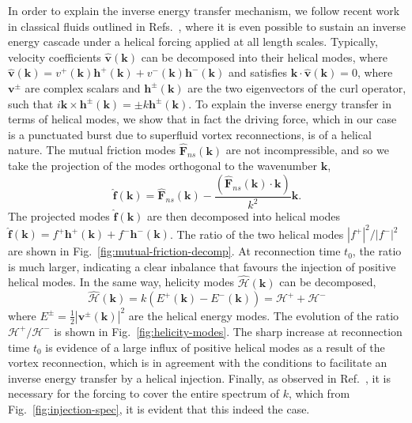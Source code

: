 \documentclass[%
 reprint,
 amsmath,amssymb,
 aps,
 prl,
]{revtex4-2}
\def \v{\mathbf{v}}
\def \k{\mathbf{k}}
\def \h{\mathbf{h}}
\begin{document}
In order to explain the inverse energy transfer mechanism, we follow recent work in classical fluids outlined in Refs.~\cite{biferaleInverseEnergyCascade2012a,plunianInverseCascadeEnergy2020a}, where it is even possible to sustain an inverse energy cascade under a helical forcing applied at all length scales. Typically, velocity coefficients $\hat{\v}(\k)$ can be decomposed into their helical modes, where $\hat{\v}(\k)=v^+(\k)\h^+(\k) + v^-(\k)\h^-(\k)$ and satisfies $\k\cdot\hat{\v}(\k)=0$, where $\v^{\pm}$ are complex scalars and $\h^{\pm}(\k)$ are the two eigenvectors of the curl operator, such that $i\k\times\h^{\pm}(\k)=\pm k \h^{\pm}(\k)$. To explain the inverse energy transfer in terms of helical modes, we show that in fact the driving force, which in our case is a punctuated burst due to superfluid vortex reconnections, is of a helical nature. The mutual friction modes $\hat{\mathbf{F}}_{ns}(\k)$ are not incompressible, and so we take the projection of the modes orthogonal to the wavenumber $\k$,
\begin{equation}
    \hat{\mathbf{f}}(\k) = \hat{\mathbf{F}}_{ns}(\k) - \frac{(\hat{\mathbf{F}}_{ns}(\k)\cdot\k)}{k^2}\k.
\end{equation}
The projected modes $\hat{\mathbf{f}}(\k)$ are then decomposed into helical modes $\hat{\mathbf{f}}(\k)=f^+\h^{+}(\k) + f^-\h^{-}(\k)$. The ratio of the two helical modes $|f^+|^2/|f^-|^2$ are shown in Fig.~\ref{fig:mutual-friction-decomp}. At reconnection time $t_0$, the ratio is much larger, indicating a clear inbalance that favours the injection of positive helical modes. In the same way, helicity modes $\hat{\mathcal{H}}(\k)$ can be decomposed,
\begin{equation}
    \hat{\mathcal{H}}(\k) = k(E^+(\k) - E^-(\k)) = \mathcal{H}^+ + \mathcal{H}^-
\end{equation}
where $E^{\pm}=\frac{1}{2}|\v^{\pm}(\k)|^2$ are the helical energy modes. The evolution of the ratio $\mathcal{H}^+/\mathcal{H}^-$ is shown in Fig.~\ref{fig:helicity-modes}. The sharp increase at reconnection time $t_0$ is evidence of a large influx of positive helical modes as a result of the vortex reconnection, which is in agreement with the conditions to facilitate an inverse energy transfer by a helical injection. Finally, as observed in Ref.~\cite{plunianInverseCascadeEnergy2020a}, it is necessary for the forcing to cover the entire spectrum of $k$, which from Fig.~\ref{fig:injection-spec}, it is evident that this indeed the case.           
\end{document}
